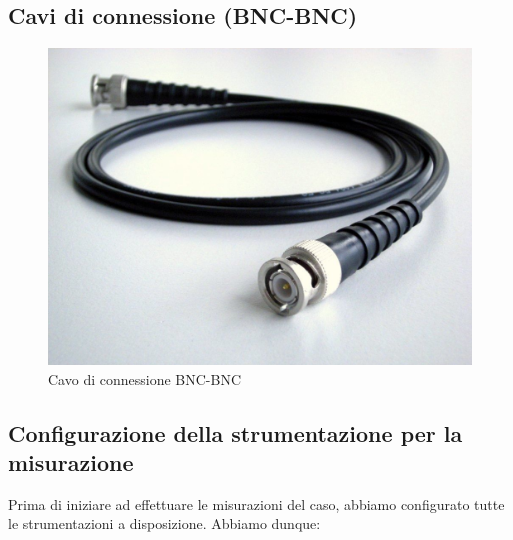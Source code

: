 \subsection*{Cavi di connessione (BNC-BNC)}
\begin{figure}[h]
    \centering
    \includegraphics[width=0.75\linewidth]{media/cavoBNC.png}
    \caption{Cavo di connessione BNC-BNC}
    \label{fig:enter-label}
\end{figure}
\FloatBarrier
\clearpage

\subsection{Configurazione della strumentazione per la misurazione}

Prima di iniziare ad effettuare le misurazioni del caso, abbiamo configurato tutte le strumentazioni a disposizione. Abbiamo dunque:

